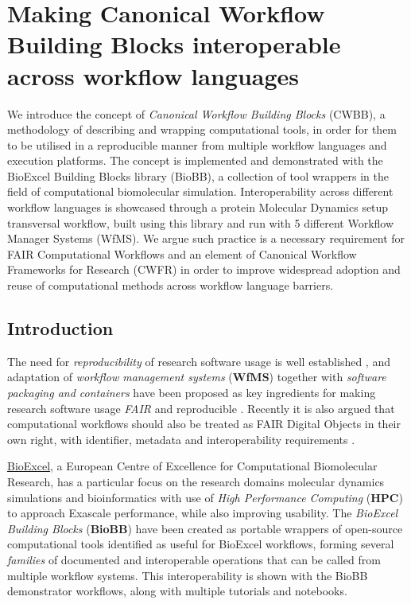 \section{Making Canonical Workflow Building Blocks interoperable across
workflow
languages}
\label{making-canonical-workflow-building-blocks-interoperable-across-workflow-languages}

We introduce the concept of \emph{Canonical Workflow Building Blocks}
(CWBB), a methodology of describing and wrapping computational tools, in
order for them to be utilised in a reproducible manner from multiple
workflow languages and execution platforms. The concept is implemented
and demonstrated with the BioExcel Building Blocks library (BioBB), a
collection of tool wrappers in the field of computational biomolecular
simulation. Interoperability across different workflow languages is
showcased through a protein Molecular Dynamics setup transversal
workflow, built using this library and run with 5 different Workflow
Manager Systems (WfMS). We argue such practice is a necessary
requirement for FAIR Computational Workflows and an element of Canonical
Workflow Frameworks for Research (CWFR) in order to improve widespread
adoption and reuse of computational methods across workflow language
barriers.

\hypertarget{introduction-1}{%
\subsection{Introduction}\label{introduction-1}}

The need for \emph{reproducibility} of research software usage is well
established \cite{Stodden 2016,Leipzig 2021,ch6-3}, and adaptation of \emph{workflow management
systems} (\textbf{WfMS}) together with \emph{software packaging and
containers} \cite{ch6-4} have been proposed as key ingredients for making
research software usage \emph{FAIR} and reproducible \cite{Cohen-Boulakia 2017,Gruning 2018b,Lamprecht 2019}.
Recently it is also argued that computational workflows should also be
treated as FAIR Digital Objects \cite{De Smedt 2020} in their own right, with
identifier, metadata \cite{Leipzig 2021} and interoperability requirements \cite{ch6-9}.

\href{https://bioexcel.eu/}{BioExcel}, a European Centre of Excellence
for Computational Biomolecular Research, has a particular focus on the
research domains molecular dynamics simulations and bioinformatics with
use of \emph{High Performance Computing} (\textbf{HPC}) to approach
Exascale performance, while also improving usability. The \emph{BioExcel
Building Blocks} (\textbf{BioBB}) \cite{ch6-10} have been created as portable
wrappers of open-source computational tools identified as useful for
BioExcel workflows, forming several \emph{families} of documented and
interoperable operations that can be called from multiple workflow
systems. This interoperability is shown with the BioBB demonstrator
workflows, along with multiple tutorials and notebooks.

